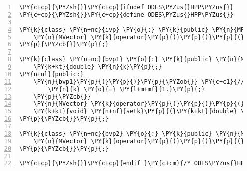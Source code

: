 \begin{Verbatim}[tabsize=2,commandchars=\\\{\},numbers=left,firstnumber=1,stepnumber=1]
\PY{c+cp}{\PYZsh{}}\PY{c+cp}{ifndef ODES\PYZus{}HPP\PYZus{}}
\PY{c+cp}{\PYZsh{}}\PY{c+cp}{define ODES\PYZus{}HPP\PYZus{}}

\PY{k}{class} \PY{n+nc}{ivp} \PY{o}{:} \PY{k}{public} \PY{n}{MFunction} \PY{p}{\PYZob{}} \PY{c+c1}{// an initial value problem class}
	\PY{n}{MVector} \PY{k}{operator}\PY{p}{(}\PY{p}{)}\PY{p}{(}\PY{k}{const} \PY{k+kt}{double}\PY{o}{\PYZam{}} \PY{n}{x}\PY{p}{,} \PY{k}{const} \PY{n}{MVector}\PY{o}{\PYZam{}} \PY{n}{y}\PY{p}{)}\PY{p}{;}
\PY{p}{\PYZcb{}}\PY{p}{;}

\PY{k}{class} \PY{n+nc}{bvp1} \PY{o}{:} \PY{k}{public} \PY{n}{MFunction} \PY{p}{\PYZob{}} \PY{c+c1}{// a boundary value problem class}
	\PY{k+kt}{double} \PY{n}{k}\PY{p}{;}
\PY{n+nl}{public:} 
	\PY{n}{bvp1}\PY{p}{(}\PY{p}{)}\PY{p}{\PYZob{}} \PY{c+c1}{// by default set k = 1 on initialising class}
		\PY{n}{k} \PY{o}{=} \PY{l+m+mf}{1.}\PY{p}{;}
	\PY{p}{\PYZcb{}}
	\PY{n}{MVector} \PY{k}{operator}\PY{p}{(}\PY{p}{)}\PY{p}{(}\PY{k}{const} \PY{k+kt}{double}\PY{o}{\PYZam{}} \PY{n}{x}\PY{p}{,} \PY{k}{const} \PY{n}{MVector}\PY{o}{\PYZam{}} \PY{n}{y}\PY{p}{)}\PY{p}{;}
	\PY{k+kt}{void} \PY{n+nf}{setk}\PY{p}{(}\PY{k+kt}{double} \PY{n}{j}\PY{p}{)}\PY{p}{;}
\PY{p}{\PYZcb{}}\PY{p}{;}

\PY{k}{class} \PY{n+nc}{bvp2} \PY{o}{:} \PY{k}{public} \PY{n}{MFunction} \PY{p}{\PYZob{}} \PY{c+c1}{// a boundary value problem class}
	\PY{n}{MVector} \PY{k}{operator}\PY{p}{(}\PY{p}{)}\PY{p}{(}\PY{k}{const} \PY{k+kt}{double}\PY{o}{\PYZam{}} \PY{n}{x}\PY{p}{,} \PY{k}{const} \PY{n}{MVector}\PY{o}{\PYZam{}} \PY{n}{y}\PY{p}{)}\PY{p}{;}
\PY{p}{\PYZcb{}}\PY{p}{;}

\PY{c+cp}{\PYZsh{}}\PY{c+cp}{endif }\PY{c+cm}{/* ODES\PYZus{}HPP\PYZus{} */}
\end{Verbatim}
